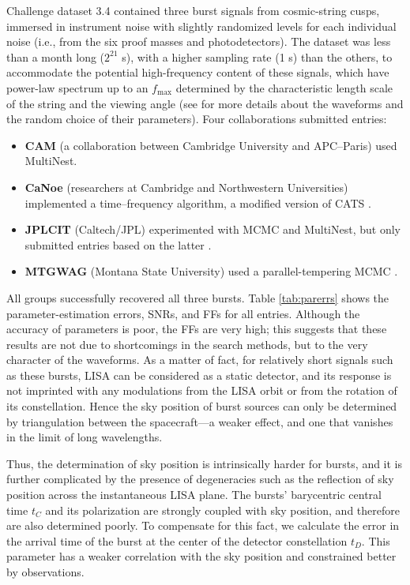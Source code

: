 \documentclass{iopart}
\begin{document}
Challenge dataset 3.4 contained three burst signals from cosmic-string cusps, immersed in instrument noise with slightly randomized levels for each individual noise (i.e., from the six proof masses and photodetectors). The dataset was less than a month long ($2^{21}$ s), with a higher sampling rate (1 s) than the others, to accommodate the potential high-frequency content of these signals, which have power-law spectrum up to an $f_\mathrm{max}$ determined by the characteristic length scale of the string and the viewing angle (see \cite{MLDC3} for more details about the waveforms and the random choice of their parameters). Four collaborations submitted entries:
%
\begin{itemize}
\item \textbf{CAM} (a collaboration between Cambridge University and APC--Paris) used MultiNest.
\item \textbf{CaNoe} (researchers at Cambridge and Northwestern Universities) implemented a time--frequency algorithm, a modified version of CATS \cite{CATS}.
\item \textbf{JPLCIT} (Caltech/JPL) experimented with MCMC and MultiNest, but only submitted entries based on the latter \cite{cohen2009}.
\item \textbf{MTGWAG} (Montana State University) used a parallel-tempering MCMC \cite{keycornish}. 
\end{itemize}
%
All groups successfully recovered all three bursts. Table \ref{tab:parerrs} shows the parameter-estimation errors, SNRs, and FFs for all entries. 
Although the accuracy of parameters is poor, the FFs are very high; this suggests that these results are not due to shortcomings in the search methods, but to the very character of the waveforms. As a matter of fact, for relatively short signals such as these bursts, LISA can be considered as a static detector, and its response is not imprinted with any modulations from the LISA orbit or from the rotation of its constellation. Hence the sky position of burst sources can only be determined by triangulation between the spacecraft---a weaker effect, and one that vanishes in the limit of long wavelengths.

Thus, the determination of sky position is intrinsically harder for bursts, and it is further complicated by the presence of degeneracies \cite{keycornish} such as the reflection of sky position across the instantaneous LISA plane. The bursts' barycentric central time $t_C$ and its polarization are strongly coupled with sky position, and therefore are also determined poorly. To compensate for this fact, we calculate the error in the arrival time of the burst at the center of the detector constellation $t_D$. This parameter has a weaker correlation with the sky position and constrained better by observations.
\end{document}
